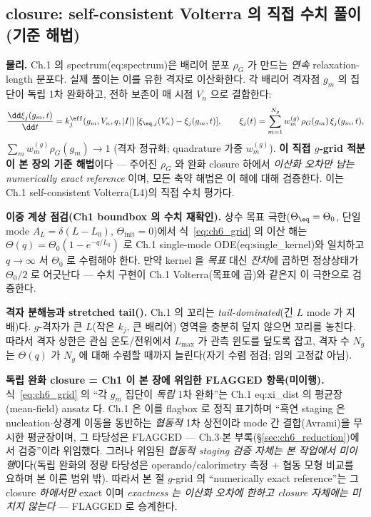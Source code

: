 \subsection{closure: self-consistent Volterra 의 직접 수치 풀이 (기준 해법)}\label{sec:ch6_grid}
\textbf{물리.} Ch.1 의 spectrum(eq:spectrum)은 배리어 분포 $\rho_G$ 가 만드는 \emph{연속} relaxation-length 분포다.
실제 풀이는 이를 유한 격자로 이산화한다. 각 배리어 격자점 $g_m$ 의 집단이 독립 1차 완화하고, 전하 보존이 매
시점 $V_n$ 으로 결합한다:
\begin{equation}
\frac{\dd\xi_j(g_m,t)}{\dd t}=k_j^{\eff}(g_m,V_n,q,|I|)\,[\xi_{\eq,j}(V_n)-\xi_j(g_m,t)],\qquad
\xi_j(t)=\sum_{m=1}^{N_g}w_m^{(g)}\,\rho_G(g_m)\,\xi_j(g_m,t),
\label{eq:ch6_grid}
\end{equation}
$\sum_m w_m^{(g)}\rho_G(g_m)\to1$ (격자 정규화; quadrature 가중 $w_m^{(g)}$). \textbf{이 직접 $g$-grid 적분이 본
장의 기준 해법}이다 — 주어진 $\rho_G$ 와 완화 closure 하에서 \emph{이산화 오차만 남는 numerically exact reference}
이며, 모든 축약 해법은 이 해에 대해 검증한다. 이는 Ch.1 self-consistent Volterra(L4)의 직접 수치 평가다.
\begin{verifybox}
\textbf{이중 계상 점검(Ch1 boundbox 의 수치 재확인).} 상수 목표 극한($\Theta_\eq=\Theta_0$, 단일 mode
$A_L=\delta(L-L_0)$, $\Theta_\mathrm{init}=0$)에서 식~\eqref{eq:ch6_grid} 의 이산 해는 $\Theta(q)=\Theta_0
(1-e^{-q/L_0})$ 로 Ch.1 single-mode ODE(eq:single\_kernel)와 일치하고 $q\to\infty$ 서 $\Theta_0$ 로 수렴해야
한다. 만약 kernel 을 \emph{목표} 대신 \emph{잔차}에 곱하면 정상상태가 $\Theta_0/2$ 로 어긋난다 — 수치 구현이
Ch.1 Volterra(목표에 곱)와 같은지 이 극한으로 검증한다.
\end{verifybox}
\begin{boundbox}
\textbf{격자 분해능과 stretched tail().} Ch.1 의 꼬리는 \emph{tail-dominated}(긴 $L$ mode 가 지배)다.
$g$-격자가 큰 $L$(작은 $k_j$, 큰 배리어) 영역을 충분히 덮지 않으면 꼬리를 놓친다. 따라서 격자 상한은 관심
온도/전위에서 $L_{\max}$ 가 관측 윈도를 덮도록 잡고, 격자 수 $N_g$ 는 $\Theta(q)$ 가 $N_g$ 에 대해 수렴할 때까지
늘린다(자기 수렴 점검; 임의 고정값 아님).
\end{boundbox}
\begin{flagbox}
\textbf{독립 완화 closure = Ch1 이 본 장에 위임한 FLAGGED 항목(미이행).} 식~\eqref{eq:ch6_grid} 의 ``각 $g_m$ 집단이
\emph{독립} 1차 완화''는 Ch.1 eq:xi\_dist 의 평균장(mean-field) ansatz 다. Ch.1 은 이를 flagbox 로 정직 표기하며
``흑연 staging 은 nucleation$\cdot$상경계 이동을 동반하는 \emph{협동적} 1차 상전이라 mode 간 결합(Avrami)을 무시한
평균장이며, 그 타당성은 FLAGGED — Ch.3$\cdot$본 부록(§\ref{sec:ch6_reduction})에서 검증''이라 위임했다. 그러나 위임된 \emph{협동적
staging 검증 자체는 본 작업에서 미이행}이다(독립 완화의 정량 타당성은 operando/calorimetry 측정 + 협동 모형 비교를
요하며 본 이론 범위 밖). 따라서 본 절 $g$-grid 의 ``numerically exact reference''는 그 closure \emph{하에서만}
exact 이며 \emph{exactness 는 이산화 오차에 한하고 closure 자체에는 미치지 않는다} — FLAGGED 로 승계한다.
\end{flagbox}

